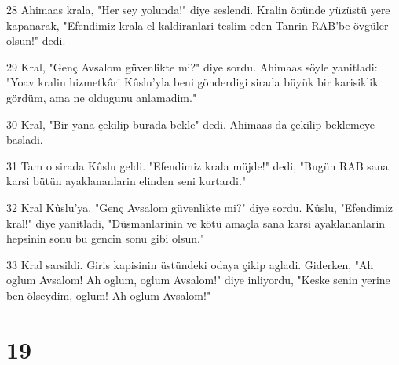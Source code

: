 \par 28 Ahimaas krala, "Her sey yolunda!" diye seslendi. Kralin önünde yüzüstü yere kapanarak, "Efendimiz krala el kaldiranlari teslim eden Tanrin RAB'be övgüler olsun!" dedi.
\par 29 Kral, "Genç Avsalom güvenlikte mi?" diye sordu. Ahimaas söyle yanitladi: "Yoav kralin hizmetkâri Kûslu'yla beni gönderdigi sirada büyük bir karisiklik gördüm, ama ne oldugunu anlamadim."
\par 30 Kral, "Bir yana çekilip burada bekle" dedi. Ahimaas da çekilip beklemeye basladi.
\par 31 Tam o sirada Kûslu geldi. "Efendimiz krala müjde!" dedi, "Bugün RAB sana karsi bütün ayaklananlarin elinden seni kurtardi."
\par 32 Kral Kûslu'ya, "Genç Avsalom güvenlikte mi?" diye sordu. Kûslu, "Efendimiz kral!" diye yanitladi, "Düsmanlarinin ve kötü amaçla sana karsi ayaklananlarin hepsinin sonu bu gencin sonu gibi olsun."
\par 33 Kral sarsildi. Giris kapisinin üstündeki odaya çikip agladi. Giderken, "Ah oglum Avsalom! Ah oglum, oglum Avsalom!" diye inliyordu, "Keske senin yerine ben ölseydim, oglum! Ah oglum Avsalom!"

\chapter{19}

